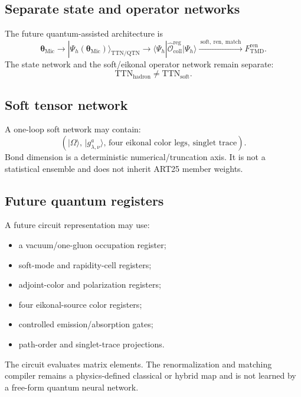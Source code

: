 \documentclass[11pt]{article}
\newcommand{\TMD}{\ensuremath{\mathrm{TMD}}}
\newcommand{\TTN}{\ensuremath{\mathrm{TTN}}}
\newcommand{\QTN}{\ensuremath{\mathrm{QTN}}}
\newcommand{\cO}{\mathcal O}
\newcommand{\Coll}{\ensuremath{\mathrm{coll}}}
\newcommand{\Ren}{\ensuremath{\mathrm{ren}}}
\newcommand{\Mic}{\ensuremath{\mathrm{Mic}}}
\begin{document}
\subsection{Separate state and operator networks}

The future quantum-assisted architecture is
\begin{equation}
 \bm\theta_{\Mic}
 \longrightarrow
 |\Psi_h(\bm\theta_{\Mic})\rangle_{\TTN/\QTN}
 \longrightarrow
 \langle\Psi_h|
 \widehat{\cO}_{\Coll}^{\mathrm{reg}}
 |\Psi_h\rangle
 \xrightarrow{\ \mathrm{soft,\ ren,\ match}\ }
 F_{\TMD}^{\Ren}.
 \label{eq:qtn-chain}
\end{equation}
The state network and the soft/eikonal operator network remain separate:
\begin{equation}
 \TTN_{\mathrm{hadron}}
 \neq
 \TTN_{\mathrm{soft}}.
 \label{eq:separate-tn}
\end{equation}

\subsection{Soft tensor network}

A one-loop soft network may contain:
\begin{equation}
 \left(
 |\Omega\rangle,\,
 |g_{\lambda,\nu}^{a}\rangle,\,
 \text{four eikonal color legs},\,
 \text{singlet trace}
 \right).
 \label{eq:soft-tn-indices}
\end{equation}
Bond dimension is a deterministic numerical/truncation axis.  It is not a statistical ensemble and does not inherit ART25 member weights.

\subsection{Future quantum registers}

A future circuit representation may use:
\begin{itemize}
\item a vacuum/one-gluon occupation register;
\item soft-mode and rapidity-cell registers;
\item adjoint-color and polarization registers;
\item four eikonal-source color registers;
\item controlled emission/absorption gates;
\item path-order and singlet-trace projections.
\end{itemize}
The circuit evaluates matrix elements.  The renormalization and matching compiler remains a physics-defined classical or hybrid map and is not learned by a free-form quantum neural network.
\end{document}
